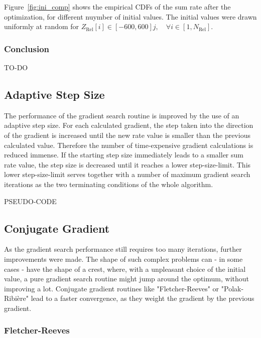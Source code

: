 Figure~\ref{fig:ini_comp} shows the empirical CDFs of the sum rate after the optimization, for different nuymber of initial values.
The initial values were drawn uniformly at random for $Z_{\text{Rel}}[i]\in[-600,600] j , \quad\forall i\in[1,N_{\text{Rel}}]$.

\subsubsection{Conclusion}
TO-DO

\subsection{Adaptive Step Size}
\label{sec:grads_stepsize}

The performance of the gradient search routine is improved by the use of an adaptive step size.
For each calculated gradient, the step taken into the direction of the gradient is increased until the new rate value is smaller than the previous calculated value.
Therefore the number of time-expensive gradient calculations is reduced immense.
If the starting step size immediately leads to a smaller sum rate value, the step size is decreased until it reaches a lower step-size-limit.
This lower step-size-limit serves together with a number of maximum gradient search iterations as the two terminating conditions of the whole algorithm.

PSEUDO-CODE 


\subsection{Conjugate Gradient}
\label{sec:grads_conjgrad}

As the gradient search performance still requires too many iterations, further improvements were made.
The shape of such complex problems can - in some cases - have the shape of a crest, where, with a unpleasant choice of the initial value, a pure gradient search routine might jump around the optimum, without improving a lot.
Conjugate gradient routines like "Fletcher-Reeves" or "Polak-Ribi\`{e}re" lead to a faster convergence, as they weight the gradient by the previous gradient. 

\subsubsection{Fletcher-Reeves}
